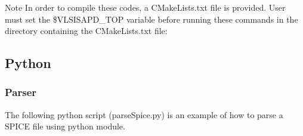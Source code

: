 \begin{DoxyNote}{Note}
In order to compile these codes, a C\+Make\+Lists.\+txt file is provided. User must set the \$\+V\+L\+S\+I\+S\+A\+P\+D\+\_\+\+T\+OP variable before running these commands in the directory containing the C\+Make\+Lists.\+txt file\+: 
\begin{DoxyCode}
\end{DoxyCode}

\end{DoxyNote}
\hypertarget{spice_spicePython}{}\subsection{Python}\label{spice_spicePython}
\hypertarget{spice_spiceParsePython}{}\subsubsection{Parser}\label{spice_spiceParsePython}
The following python script ({\ttfamily parse\+Spice.\+py}) is an example of how to parse a S\+P\+I\+CE file using python module. 
